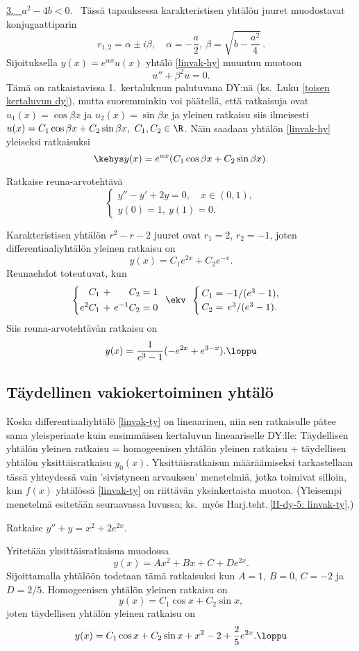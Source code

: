 \underline{3. \ $a^2-4b<0$}. \ Tässä tapauksessa karakteristisen yhtälön juuret muodostavat
konjugaattiparin
\[
r_{1,2}=\alpha\pm i\beta,\quad \alpha=-\frac{a}{2}, \ \beta=\sqrt{b-\frac{a^2}{4}}\,.
\]
Sijoituksella $y(x)=e^{\alpha x}u(x)$ yhtälö \eqref{linvak-hy} muuntuu muotoon
\[
u''+\beta^2 u = 0.
\]
Tämä on ratkaistavissa 1.\ kertalukuun palutuvana DY:nä (ks.\ Luku \ref{toisen kertaluvun dy}),
mutta suoremminkin voi päätellä, että ratkaisuja ovat
$u_1(x)=\cos\beta x$ ja $u_2(x)=\sin\beta x$ ja yleinen ratkaisu siis ilmeisesti
$u(x)=C_1\cos\beta x+C_2\sin\beta x,\ C_1,C_2\in\R$. Näin saadaan yhtälön \eqref{linvak-hy}
yleiseksi ratkaisuksi
\[
\kehys y(x)=e^{\alpha x}(C_1\cos\beta x + C_2\sin\beta x).
\]
\begin{Exa}
Ratkaise reuna-arvotehtävä
\[
\begin{cases}
y''-y'+2y=0,\quad x\in (0,1), \\
y(0)=1, \ y(1)=0.
\end{cases}
\]
\end{Exa}
\ratk Karakteristisen yhtälön $r^2-r-2$ juuret ovat $r_1=2$, $r_2=-1$, joten 
differentiaaliyhtälön yleinen ratkaisu on
\[
y(x)=C_1e^{2x}+C_2e^{-x}.
\]
Reunaehdot toteutuvat, kun
\[
\left\{ \begin{alignedat}{3}
&C_1 \ + \ & &C_2 & &=1 \\
e^2&C_1 \ + \ & e^{-1}&C_2 & &=0
\end{alignedat} \right. \,\ \ekv \,\ 
\begin{cases}
\,C_1=-1/(e^3-1), \\
\,C_2=\,e^3/(e^3-1).
\end{cases}
\]
Siis reuna-arvotehtävän ratkaisu on
\[
y(x)=\frac{1}{e^3-1}(-e^{2x}+e^{3-x}). \loppu
\] 

\subsection{Täydellinen vakiokertoiminen yhtälö}

Koska differentiaaliyhtälö \eqref{linvak-ty} on lineaarinen, niin sen ratkaisulle pätee sama
yleisperiaate kuin ensimmäisen kertaluvun lineaariselle DY:lle: Täydellisen yhtälön yleinen
ratkaisu = homogeenisen yhtälön yleinen ratkaisu + täydellisen yhtälön yksittäisratkaisu
$y_0(x)$. Yksittäisratkaisun määräämiseksi tarkastellaan tässä yhteydessä vain 'sivistyneen
arvauksen' menetelmiä, jotka toimivat silloin, kun $f(x)$ yhtälössä \eqref{linvak-ty} on
riittävän yksinkertaista muotoa. (Yleisempi menetelmä esitetään seuraavassa luvussa; ks.\ myös
Harj.teht.\,\ref{H-dy-5: linvak-ty}.)
\begin{Exa}
Ratkaise $y''+y=x^2+2e^{2x}$.
\end{Exa}
\ratk Yritetään yksittäisratkaisua muodossa
\[
y(x)=Ax^2+Bx+C+De^{2x}.
\]
Sijoittamalla yhtälöön todetaan tämä ratkaisuksi kun $A=1$, $B=0$, $C=-2$ ja $D=2/5$.
Homogeenisen yhtälön yleinen ratkaisu on
\[
y(x)=C_1\cos x+C_2\sin x,
\]
joten täydellisen yhtälön yleinen ratkaisu on
\[
y(x)=C_1\cos x+C_2\sin x+x^2-2+\frac{2}{5}e^{2x}. \loppu
\]

